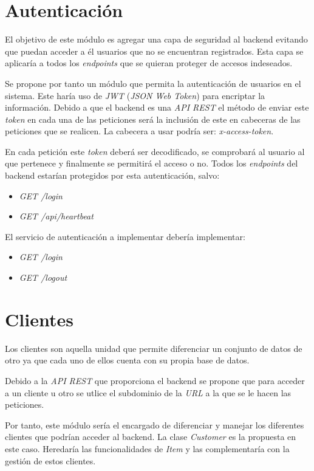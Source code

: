 \section{Autenticación}

El objetivo de este módulo es agregar una capa de seguridad al backend evitando que puedan acceder a él usuarios que no se encuentran registrados. Esta capa se aplicaría a todos los \textit{endpoints} que se quieran proteger de accesos indeseados.

Se propone por tanto un módulo que permita la autenticación de usuarios en el sistema. Este haría uso de \textit{JWT} (\textit{JSON Web Token}) para encriptar la información. Debido a que el backend es una \textit{API REST} el método de enviar este \textit{token} en cada una de las peticiones será la inclusión de este en cabeceras de las peticiones que se realicen. La cabecera a usar podría ser: \textit{x-access-token}.

En cada petición este \textit{token} deberá ser decodificado, se comprobará al usuario al que pertenece y finalmente se permitirá el acceso o no. Todos los \textit{endpoints} del backend estarían protegidos por esta autenticación, salvo:
\begin{itemize}
	\item \textit{GET /login}
	\item \textit{GET /api/heartbeat}
\end{itemize}


\bigskip
El servicio de autenticación a implementar debería implementar:
\begin{itemize}
	\item \textit{GET /login}
	\item \textit{GET /logout}
\end{itemize}



\section{Clientes}

Los clientes son aquella unidad que permite diferenciar un conjunto de datos de otro ya que cada uno de ellos cuenta con su propia base de datos. 

Debido a la \textit{API REST} que proporciona el backend se propone que para acceder a un cliente u otro se utlice el subdominio de la \textit{URL} a la que se le hacen las peticiones.

Por tanto, este módulo sería el encargado de diferenciar y manejar los diferentes clientes que podrían acceder al backend. La clase \textit{Customer} es la propuesta en este caso. Heredaría las funcionalidades de \textit{Item} y las complementaría con la gestión de estos clientes.

